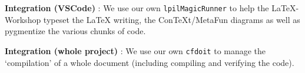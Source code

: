 \textbf{Integration (VSCode)} : We use our own \verb|lpilMagicRunner| to help
the LaTeX-Workshop typeset the LaTeX writing, the ConTeXt/MetaFun diagrams as
well as pygmentize the various chunks of code.

\textbf{Integration (whole project)} : We use our own \verb|cfdoit| to manage
the `compilation' of a whole document (including compiling and verifying the
code).





